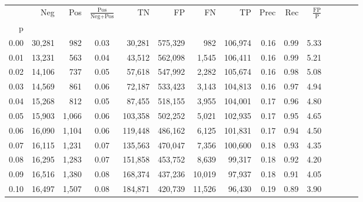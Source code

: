 \begin{tabular}{rrrcrrrrrrrrrrr}
\toprule
{} &     Neg &    Pos & $\frac{\text{Pos}}{\text{Neg}+\text{Pos}}$ &       TN &       FP &       FN &       TP &  Prec &   Rec & $\frac{\text{FP}}{\text{P}}$ \\
p    &         &        &                                            &          &          &          &          &       &       &                              \\
\midrule
0.00 &  30,281 &    982 &                                       0.03 &   30,281 &  575,329 &      982 &  106,974 &  0.16 &  0.99 &                         5.33 \\
0.01 &  13,231 &    563 &                                       0.04 &   43,512 &  562,098 &    1,545 &  106,411 &  0.16 &  0.99 &                         5.21 \\
0.02 &  14,106 &    737 &                                       0.05 &   57,618 &  547,992 &    2,282 &  105,674 &  0.16 &  0.98 &                         5.08 \\
0.03 &  14,569 &    861 &                                       0.06 &   72,187 &  533,423 &    3,143 &  104,813 &  0.16 &  0.97 &                         4.94 \\
0.04 &  15,268 &    812 &                                       0.05 &   87,455 &  518,155 &    3,955 &  104,001 &  0.17 &  0.96 &                         4.80 \\
0.05 &  15,903 &  1,066 &                                       0.06 &  103,358 &  502,252 &    5,021 &  102,935 &  0.17 &  0.95 &                         4.65 \\
0.06 &  16,090 &  1,104 &                                       0.06 &  119,448 &  486,162 &    6,125 &  101,831 &  0.17 &  0.94 &                         4.50 \\
0.07 &  16,115 &  1,231 &                                       0.07 &  135,563 &  470,047 &    7,356 &  100,600 &  0.18 &  0.93 &                         4.35 \\
0.08 &  16,295 &  1,283 &                                       0.07 &  151,858 &  453,752 &    8,639 &   99,317 &  0.18 &  0.92 &                         4.20 \\
0.09 &  16,516 &  1,380 &                                       0.08 &  168,374 &  437,236 &   10,019 &   97,937 &  0.18 &  0.91 &                         4.05 \\
0.10 &  16,497 &  1,507 &                                       0.08 &  184,871 &  420,739 &   11,526 &   96,430 &  0.19 &  0.89 &                         3.90 \\

\end{tabular}
